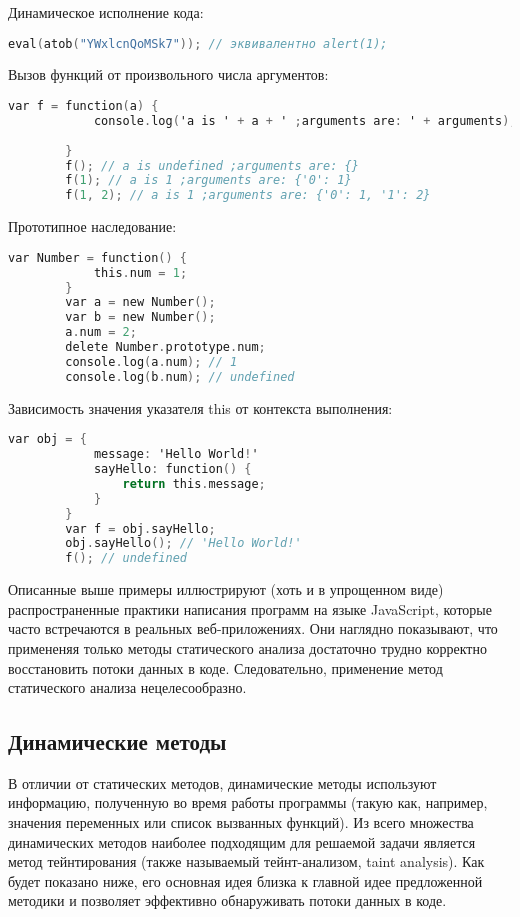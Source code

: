 	\bigskip
	Динамическое исполнение кода:
	\begin{lstlisting}[language=C]
		eval(atob("YWxlcnQoMSk7")); // эквивалентно alert(1);
	\end{lstlisting}

	\bigskip
	Вызов функций от произвольного числа аргументов:
	\begin{lstlisting}[language=C]
		var f = function(a) {
			console.log('a is ' + a + ' ;arguments are: ' + arguments);
			
		}
		f(); // a is undefined ;arguments are: {}
		f(1); // a is 1 ;arguments are: {'0': 1}
		f(1, 2); // a is 1 ;arguments are: {'0': 1, '1': 2}
	\end{lstlisting}		

	\bigskip
	Прототипное наследование:
	\begin{lstlisting}[language=C]
		var Number = function() {
			this.num = 1;
		}
		var a = new Number();
		var b = new Number();
		a.num = 2;
		delete Number.prototype.num;
		console.log(a.num); // 1
		console.log(b.num); // undefined
	\end{lstlisting}	

	\bigskip
	Зависимость значения указателя this от контекста выполнения:
	\begin{lstlisting}[language=C]
		var obj = {
			message: 'Hello World!'
			sayHello: function() {
				return this.message;
			}
		}
		var f = obj.sayHello;
		obj.sayHello(); // 'Hello World!'
		f(); // undefined
	\end{lstlisting}	


	Описанные выше примеры иллюстрируют (хоть и в упрощенном виде) распространенные практики написания программ на языке JavaScript, которые часто встречаются в реальных веб-приложениях. Они наглядно показывают, что примененяя только методы статического анализа достаточно трудно корректно восстановить потоки данных в коде. Следовательно, применение метод статического анализа нецелесообразно.

\subsection{Динамические методы}
	В отличии от статических методов, динамические методы используют информацию, полученную во время работы программы (такую как, например, значения переменных или список вызванных функций). Из всего множества динамических методов наиболее подходящим для решаемой задачи является метод тейнтирования (также называемый тейнт-анализом, taint analysis). Как будет показано ниже, его основная идея близка к главной идее предложенной методики и позволяет эффективно обнаруживать потоки данных в коде.



